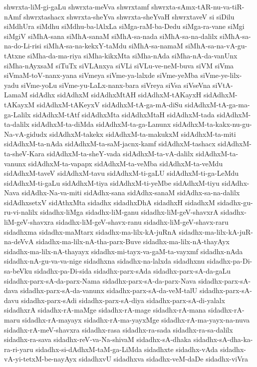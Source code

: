 {shwrxta-liM-gi-gaLu
shwrxta-meVva
shwrxtamf
shwrxta-sAmx-tAR-nu-va-tiR-nAmf
shwrxtashacx
shwrxta-sheYva
shwrxta-sheYvaH
shwrxtaveV
si
siDilu
siMdhUra
siMdhu
siMdhu-ba-lAlxLa
siMga-raM-ba-Dedu
siMga-ra-vane
siMgi
siMgiV
siMhA-sana
siMhA-sanaM
siMhA-sa-nada
siMhA-sa-na-dalilx
siMhA-sa-na-do-Li-risi
siMhA-sa-na-kekxY-taMdu
siMhA-sa-namaM
siMhA-sa-na-vA-gu-tAtxne
siMha-da-ma-riya
siMha-kikxMta
siMha-nAda
siMha-nA-da-vanUnx
siMha-nAyxsaM
siTuTx
siVLAnxya
siVLi
siVLu-ve-neM-buva
siVM
siVma
siVmaM-toV-nanx-yana
siVmeya
siVme-ya-lalxde
siVme-yeMba
siVme-ye-lilx-yadu
siVme-yoLu
siVme-yu-LaLx-nanx-bara
siVreya
siVsa
siVseVna
siVtA-LamaM
sidAdhx
sidAdhxM
sidAdhxMtAH
sidAdhxM-tAKayxH
sidAdhxM-tAKayxM
sidAdhxM-tAKeyxV
sidAdhxM-tA-ga-mA-diSu
sidAdhxM-tA-ga-ma-ga-Lalilx
sidAdhxM-tAtf
sidAdhxMta
sidAdhxMtaH
sidAdhxM-tada
sidAdhxM-ta-dalilx
sidAdhxM-ta-diMda
sidAdhxM-ta-ga-Lanunx
sidAdhxM-ta-kakx-nu-gu-Na-vA-gidudx
sidAdhxM-takekx
sidAdhxM-ta-makukxM
sidAdhxM-ta-miti
sidAdhxM-ta-nAda
sidAdhxM-ta-saM-jacnx-kamf
sidAdhxM-tashacx
sidAdhxM-ta-sheV-Kara
sidAdhxM-ta-sheY-vada
sidAdhxM-ta-vA-dalilx
sidAdhxM-ta-vanunx
sidAdhxM-ta-vapapx
sidAdhxM-ta-veMba
sidAdhxM-ta-veMdu
sidAdhxM-taveV
sidAdhxM-tavu
sidAdhxM-ti-gaLU
sidAdhxM-ti-ga-LeMdu
sidAdhxM-ti-gaLu
sidAdhxM-tiya
sidAdhxM-ti-yeMbe
sidAdhxM-tiyu
sidAdhx-Nava
sidAdhx-Na-va-miti
sidAdhx-sana
sidAdhx-sanaM
sidAdhx-sa-na-dalilx
sidAdhxsetxV
sidAthxMta
sidadhx
sidadhxDhA
sidadhxH
sidadhxM
sidadhx-gu-ru-vi-nalilx
sidadhx-liMga
sidadhx-liM-ganu
sidadhx-liM-geV-shavxrA
sidadhx-liM-geV-shavxra
sidadhx-liM-geV-shavx-ranu
sidadhx-liM-geV-shavx-raru
sidadhxma
sidadhx-maMtarx
sidadhx-ma-lilx-kA-juRnA
sidadhx-ma-lilx-kA-juR-na-deVvA
sidadhx-ma-lilx-nA-tha-parx-Buve
sidadhx-ma-lilx-nA-thayAyx
sidadhx-ma-lilx-nA-thayayx
sidadhx-mi-tayx-va-gaM-ta-vayxmf
sidadhx-nAda
sidadhx-nA-gu-va-va-nige
sidadhxna
sidadhx-na-lalxda
sidadhxnu
sidadhx-pa-Di-sa-beVku
sidadhx-pa-Di-sida
sidadhx-parx-sAda
sidadhx-parx-sA-da-gaLu
sidadhx-parx-sA-da-parx-Nama
sidadhx-parx-sA-da-parx-Nava
sidadhx-parx-sA-dava
sidadhx-parx-sA-da-vanunx
sidadhx-parx-sA-da-veM-talU
sidadhx-parx-sA-davu
sidadhx-parx-sAdi
sidadhx-parx-sA-diya
sidadhx-parx-sA-di-yalalx
sidadhxrA
sidadhx-rA-maMge
sidadhx-rA-mage
sidadhx-rA-mana
sidadhx-rA-maru
sidadhx-rA-mayayx
sidadhx-rA-ma-yayxMge
sidadhx-rA-ma-yayx-na-nuva
sidadhx-rA-meV-shavxra
sidadhx-rasa
sidadhx-ra-sada
sidadhx-ra-sa-dalilx
sidadhx-ra-sava
sidadhx-reV-va-Na-shivaM
sidadhx-sA-dhaka
sidadhx-sA-dha-ka-ra-ri-yaru
sidadhx-si-dAdhxM-taM-ga-LiMda
sidadhxte
sidadhx-vAda
sidadhx-vA-yi-tetxM-be-nayAyx
sidadhxvU
sidadhxva
sidadhx-veM-daDe
sidadhx-viVra
}
